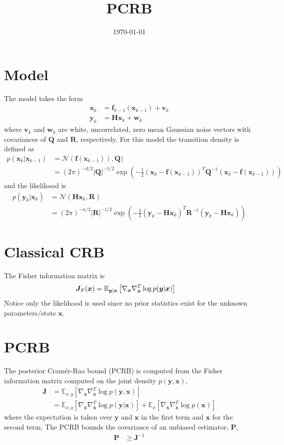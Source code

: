 \documentclass{article}
\title{PCRB}
\date{\today}
\renewcommand{\vec}[1]{\ensuremath{{\boldsymbol #1}}}
\newcommand{\mat}[1]{\ensuremath{\boldsymbol{#1}}}
\begin{document}
\section{Model}

The model takes the form
\begin{subequations}
	\label{eqn:model_general}
\begin{align}
	\vec x_k &= \vec f_{k-1}(\vec x_{k-1}) + \vec v_k \\
	\vec y_k &= \mat H\vec x_k + \vec w_k
\end{align}
\end{subequations}
where $\vec v_k$ and $\vec w_k$ are white, uncorrelated, zero mean Gaussian noise vectors with covariances of $\mat Q$ and $\mat R$, respectively. For this model the transition density is defined as
\begin{align}
	p(\vec x_k|\vec x_{k-1}) &= \mathcal N(\vec f(\vec x_{k-1})),\mat Q) \\
	&= (2\pi)^{-d/2} |\mat Q|^{-1/2} \exp\left(-\frac{1}{2}(\vec x_k - \vec f(\vec x_{k-1}))^T \mat Q^{-1} (\vec x_k - \vec f(\vec x_{k-1})) \right)
\end{align}
and the likelihood is
\begin{align}
	p(\vec y_k|\vec x_k) &= \mathcal N(\mat H\vec x_k,\mat R) \\
	&= (2\pi)^{-n/2} |\mat R|^{-1/2} \exp\left(-\frac{1}{2}(\vec y_k - \mat H\vec x_k)^T \mat R^{-1} (\vec y_k - \mat H\vec x_k) \right)
\end{align}

\section{Classical CRB}

The Fisher information matrix is
\begin{align}
	\mat J_{\rm F}(\vec x) &= \mathbb E_{\vec y| \vec x}\left[ \nabla_{\vec x}\nabla_{\vec x}^T \log p(\vec y|\vec x) \right]
\end{align}
Notice only the likelihood is used since no prior statistics exist for the unknown parameters/state $\vec x$.

\section{PCRB}

The posterior Cram\'er-Rao bound (PCRB) is computed from the Fisher information matrix computed on the joint density $p(\vec y,\vec x)$,
\begin{align}
	\mat J &= \mathbb E_{x,y}\left[ \nabla_{\vec x}\nabla_{\vec x}^T \log p(\vec y,\vec x) \right] \\
	&= \mathbb E_{x,y}\left[ \nabla_{\vec x}\nabla_{\vec x}^T \log p(\vec y|\vec x) \right] + \mathbb E_{x}\left[ \nabla_{\vec x}\nabla_{\vec x}^T \log p(\vec x) \right]
\end{align}
where the expectation is taken over $\vec y$ and $\vec x$ in the first term and $\vec x$ for the second term. The PCRB bounds the covariance of an unbiased estimator, $\mat P$,
\begin{align}
	\mat P &\ge \mat J^{-1}
\end{align}
\end{document}
